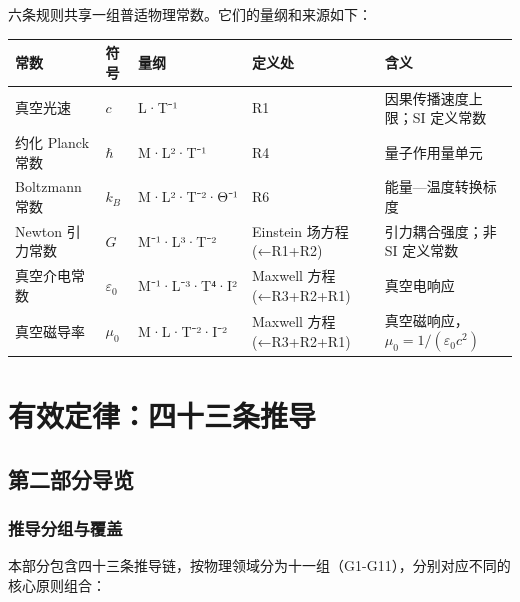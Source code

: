 \documentclass[11pt,a4paper,openany]{book}
\begin{document}
六条规则共享一组普适物理常数。它们的量纲和来源如下：

\begin{center}
\footnotesize
\begin{tabular}{p{2.2cm}p{1.5cm}p{3.5cm}p{2cm}p{5cm}}
\toprule
\textbf{常数} & \textbf{符号} & \textbf{量纲} & \textbf{定义处} & \textbf{含义} \\
\midrule
真空光速 & $c$ & L·T⁻¹ & R1 & 因果传播速度上限；SI 定义常数 \\
约化 Planck 常数 & $\hbar$ & M·L²·T⁻¹ & R4 & 量子作用量单元 \\
Boltzmann 常数 & $k_B$ & M·L²·T⁻²·Θ⁻¹ & R6 & 能量—温度转换标度 \\
Newton 引力常数 & $G$ & M⁻¹·L³·T⁻² & Einstein 场方程(←R1+R2) & 引力耦合强度；非 SI 定义常数 \\
真空介电常数 & $\varepsilon_0$ & M⁻¹·L⁻³·T⁴·I² & Maxwell 方程(←R3+R2+R1) & 真空电响应 \\
真空磁导率 & $\mu_0$ & M·L·T⁻²·I⁻² & Maxwell 方程(←R3+R2+R1) & 真空磁响应，$\mu_0=1/(\varepsilon_0 c^2)$ \\
\bottomrule
\end{tabular}
\end{center}

\clearpage








\part{有效定律：四十三条推导}

\chapter*{第二部分导览}

\section*{推导分组与覆盖}

本部分包含四十三条推导链，按物理领域分为十一组（G1-G11），分别对应不同的核心原则组合：
\end{document}
